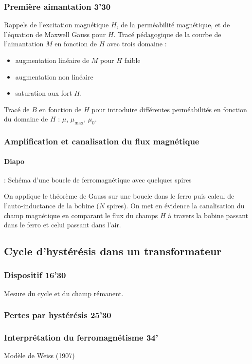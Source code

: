 \subsubsection{Première aimantation 3'30}

Rappels de l'excitation magnétique $H$, de la perméabilité magnétique, et de l'équation de Maxwell Gauss pour $H$.
Tracé pédagogique de la courbe de l'aimantation $M$ en fonction de $H$ avec trois domaine :
\begin{itemize}
\item augmentation linéaire de $M$ pour $H$ faible
\item augmentation non linéaire
\item saturation aux fort $H$.
\end{itemize}

Tracé de $B$ en fonction de $H$ pour introduire différentes perméabilités en fonction du domaine de $H$ : $\mu$, $\mu_\mathrm{max}$, $\mu_0$.

\subsubsection{Amplification et canalisation du flux magnétique}

\paragraph{Diapo} : Schéma d'une boucle de ferromagnétique avec quelques spires

On applique le théorème de Gauss sur une boucle dans le ferro puis calcul de l'auto-inductance de la bobine ($N$ spires).
On met en évidence la canalisation du champ magnétique en comparant le flux du champs $H$ à travers la bobine passant dans le ferro et celui passant dans l'air.

\subsection{Cycle d'hystérésis dans un transformateur}

\subsubsection{Dispositif 16'30}

Mesure du cycle et du champ rémanent.

\subsubsection{Pertes par hystérésis 25'30}

\subsubsection{Interprétation du ferromagnétisme 34'}

Modèle de Weiss (1907)

